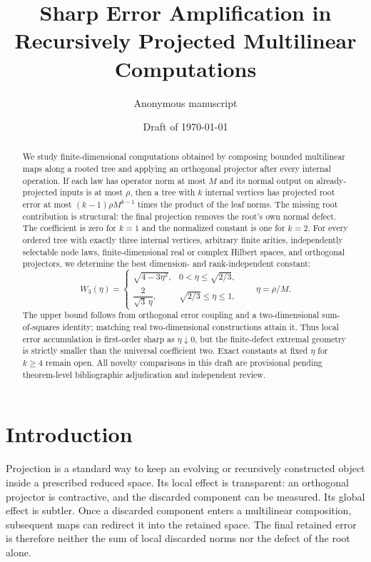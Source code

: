 \documentclass[11pt]{article}
\title{\textbf{Sharp Error Amplification in Recursively Projected Multilinear Computations}}
\author{Anonymous manuscript}
\date{Draft of \today}
\theoremstyle{definition}
\begin{document}
\maketitle

\begin{abstract}
We study finite-dimensional computations obtained by composing bounded
multilinear maps along a rooted tree and applying an orthogonal projector after
every internal operation.  If each law has operator norm at most $M$ and its
normal output on already-projected inputs is at most $\rho$, then a tree with
$k$ internal vertices has projected root error at most
$(k-1)\rho M^{k-1}$ times the product of the leaf norms.  The missing root
contribution is structural: the final projection removes the root's own normal
defect.  The coefficient is zero for $k=1$ and the normalized constant is one
for $k=2$.  For every ordered tree with exactly three internal vertices,
arbitrary finite arities, independently selectable node laws, finite-dimensional
real or complex Hilbert spaces, and orthogonal projectors, we determine the best
dimension- and rank-independent constant:
\[
 W_3(\eta)=
 \begin{cases}
 \sqrt{4-3\eta^2},&0<\eta\le \sqrt{2/3},\\[1mm]
 \dfrac{2}{\sqrt3\,\eta},&\sqrt{2/3}\le\eta\le1,
 \end{cases}
 \qquad \eta=\rho/M.
\]
The upper bound follows from orthogonal error coupling and a two-dimensional
sum-of-squares identity; matching real two-dimensional constructions attain it.
Thus local error accumulation is first-order sharp as $\eta\downarrow0$, but
the finite-defect extremal geometry is strictly smaller than the universal
coefficient two.  Exact constants at fixed $\eta$ for $k\ge4$ remain open.
All novelty comparisons in this draft are provisional pending theorem-level
bibliographic adjudication and independent review.
\end{abstract}

\section{Introduction}

Projection is a standard way to keep an evolving or recursively constructed
object inside a prescribed reduced space.  Its local effect is transparent:
an orthogonal projector is contractive, and the discarded component can be
measured.  Its global effect is subtler.  Once a discarded component enters a
multilinear composition, subsequent maps can redirect it into the retained
space.  The final retained error is therefore neither the sum of local
discarded norms nor the defect of the root alone.
\end{document}
